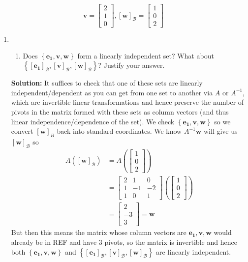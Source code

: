 \documentclass[letterpaper,12pt]{article}
\newcommand{\set}[1]{\left\{ #1 \right\}}
\theoremstyle{definition}
\begin{document}
$$\mathbf{v} = \begin{bmatrix}
    2 \\ 1 \\ 0
\end{bmatrix}, [\mathbf{w}]_\mathcal{B} = \begin{bmatrix}
    1 \\ 0 \\ 2
\end{bmatrix}$$
\begin{enumerate}
    \item[] \begin{enumerate}
        \item[] Does $\set{\mathbf{e_1},\mathbf{v},\mathbf{w}}$ form a linearly independent set? What about $\set{[\mathbf{e_1}]_\mathcal{B}, [\mathbf{v}]_\mathcal{B}, [\mathbf{w}]_\mathcal{B}}$? Justify your answer.
    \end{enumerate}
    \begin{mdframed}
        \textbf{Solution:}
        It suffices to check that one of these sets are linearly independent/dependent as you can get from one set to another via $A$ or $A^{-1}$, which are invertible linear transformations and hence preserve the number of pivots in the matrix formed with these sets as column vectors (and thus linear independence/dependence of the set). We check  $\set{\mathbf{e_1},\mathbf{v},\mathbf{w}}$ so we convert $[\mathbf{w}]_B$ back into standard coordinates. We know $A^{-1}\mathbf{w}$ will give us $[\mathbf{w}]_\mathcal{B}$ so \begin{align*}
            A([\mathbf{w}]_\mathcal{B}) &= A\left (\begin{bmatrix}
    1 \\ 0 \\ 2
\end{bmatrix} \right ) \\
&= \begin{bmatrix}
        2 & 1 & 0  \\
        1 & -1 & -2 \\
        1 & 0 & 1 
    \end{bmatrix}\left (\begin{bmatrix}
    1 \\ 0 \\ 2
\end{bmatrix} \right ) \\
&= \begin{bmatrix}
    2 \\ -3 \\ 3
\end{bmatrix} = \mathbf{w}
\end{align*}
But then this means the matrix whose column vectors are $\mathbf{e_1},\mathbf{v},\mathbf{w}$ would already be in REF and have 3 pivots, so the matrix is invertible and hence both $\set{\mathbf{e_1},\mathbf{v},\mathbf{w}}$ and $\set{[\mathbf{e_1}]_\mathcal{B}, [\mathbf{v}]_\mathcal{B}, [\mathbf{w}]_\mathcal{B}}$ are linearly independent.
    \end{mdframed}
\end{enumerate}
\end{document}

